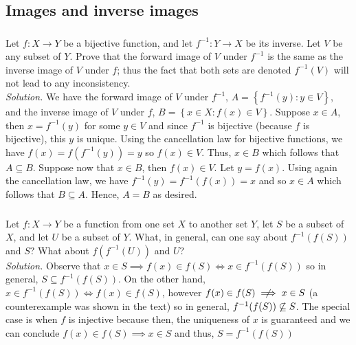 \documentclass{amsart}
\theoremstyle{definition}
\newcommand{\set}[1]{\left\{#1\right\}}
\begin{document}
\subsection{Images and inverse images} 

\subsubsection{} Let $f:X\to Y$ be a bijective function, and let $f^{-1}:Y\to X$ be its inverse. Let $V$ be any subset of $Y$. Prove that the forward image of $V$ under $f^{-1}$ is the same as the inverse image of $V$ under $f$; thus the fact that both sets are denoted $f^{-1}(V)$ will not lead to any inconsistency. \\

\textit{Solution.} We have the forward image of $V$ under $f^{-1}$, $A=\set{f^{-1}(y):y\in V}$, and the inverse image of $V$ under $f$, $B=\set{x\in X: f(x)\in V}$. Suppose $x\in A$, then $x=f^{-1}(y)$ for some $y\in V$ and since $f^{-1}$ is bijective (because $f$ is bijective), this $y$ is unique. Using the cancellation law for bijective functions, we have $f(x)=f(f^{-1}(y))=y$ so $f(x)\in V$. Thus, $x\in B$ which follows that $A\subseteq B$. Suppose now that $x\in B$, then $f(x)\in V$. Let $y=f(x)$. Using again the cancellation law, we have $f^{-1}(y)=f^{-1}(f(x))=x$ and so $x\in A$ which follows that $B\subseteq A$. Hence, $A=B$ as desired. \\


\subsubsection{} Let $f:X\to Y$ be a function from one set $X$ to another set $Y$, let $S$ be a subset of $X$, and let $U$ be a subset of $Y$. What, in general, can one say about $f^{-1}(f(S))$ and $S$? What about $f(f^{-1}(U))$ and $U$? \\

\textit{Solution.} Observe that $x\in S \implies f(x)\in f(S) \iff x\in f^{-1}(f(S))$ so in general, $S\subseteq f^{-1}(f(S))$.  On the other hand, $x\in f^{-1}(f(S)) \iff f(x)\in f(S)$, however $f(x)\in f(S)\centernot\implies x\in S$ (a counterexample was shown in the text) so in general, $f^{-1}(f(S))\centernot\subseteq S$. The special case is when $f$ is injective because then, the uniqueness of $x$ is guaranteed and we can conclude $f(x)\in f(S)\implies x\in S$ and thus, $S=f^{-1}(f(S))$ \\
\end{document}
